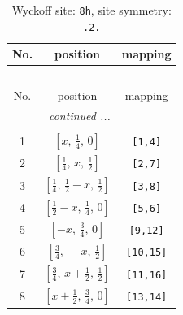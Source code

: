 \documentclass[fleqn,8pt]{jsarticle}
\begin{document}
\begin{longtable}{ccc}
\caption{Wyckoff site: {\tt 8h}, site symmetry: {\tt .2.}}
 \\
 \hline \hline
No. & position & mapping \\ \hline \endfirsthead

\multicolumn{2}{l}{\tablename\ \thetable{}} \\
 \hline \hline
No. & position & mapping \\ \hline \endhead

 \hline \hline
\multicolumn{2}{r}{\footnotesize\it continued ...} \\ \endfoot

 \hline \hline
\multicolumn{2}{r}{} \\ \endlastfoot

1 & $\left[ x,\, \frac{1}{4},\, 0 \right]$ & {\tt [1,4]} \\ \hline
2 & $\left[ \frac{1}{4},\, x,\, \frac{1}{2} \right]$ & {\tt [2,7]} \\ \hline
3 & $\left[ \frac{1}{4},\, \frac{1}{2} - x,\, \frac{1}{2} \right]$ & {\tt [3,8]} \\ \hline
4 & $\left[ \frac{1}{2} - x,\, \frac{1}{4},\, 0 \right]$ & {\tt [5,6]} \\ \hline
5 & $\left[ - x,\, \frac{3}{4},\, 0 \right]$ & {\tt [9,12]} \\ \hline
6 & $\left[ \frac{3}{4},\, - x,\, \frac{1}{2} \right]$ & {\tt [10,15]} \\ \hline
7 & $\left[ \frac{3}{4},\, x + \frac{1}{2},\, \frac{1}{2} \right]$ & {\tt [11,16]} \\ \hline
8 & $\left[ x + \frac{1}{2},\, \frac{3}{4},\, 0 \right]$ & {\tt [13,14]} \\
\end{longtable}
\renewcommand{\arraystretch}{1.2}
\end{document}

